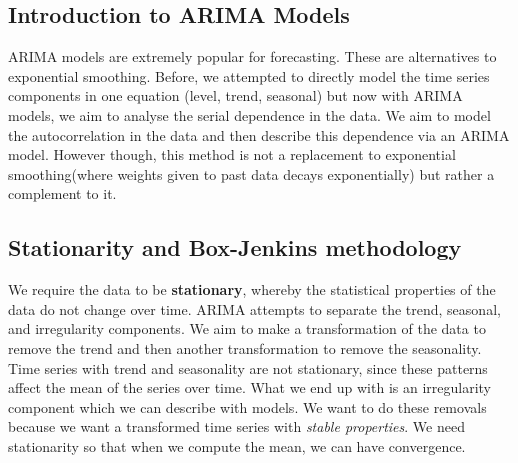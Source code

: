 \documentclass[11pt, oneside]{article}
\theoremstyle{definition}
\begin{document}
\subsection{Introduction to ARIMA Models}
ARIMA models are extremely popular for forecasting. These are alternatives to exponential smoothing. Before, we attempted to directly model the time series components in one equation (level, trend, seasonal) but now with ARIMA models, we aim to analyse the serial dependence in the data. We aim to model the autocorrelation in the data and then describe this dependence via an ARIMA model. However though, this method is not a replacement to exponential smoothing(where weights given to past data decays exponentially) but rather a complement to it.
\subsection{Stationarity and Box-Jenkins methodology}
We require the data to be \textbf{stationary}, whereby the statistical properties of the data do not change over time. ARIMA attempts to separate the trend, seasonal, and irregularity components. We aim to make a transformation of the data to remove the trend and then another transformation to remove the seasonality. Time series with trend and seasonality are not stationary, since these patterns affect the mean of the series over time. What we end up with is an irregularity component which we can describe with models. We want to do these removals because we want a transformed time series with \textit{stable properties}. We need stationarity so that when we compute the mean, we can have convergence.
\end{document}
